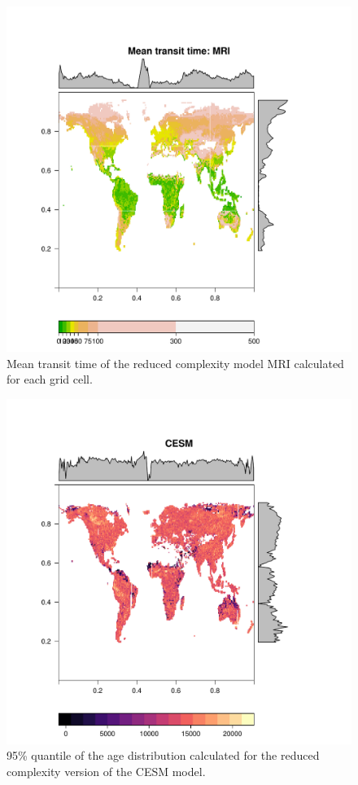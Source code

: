 \documentclass{agujournal}
\begin{document}
\begin{figure}[t]
   \centering
   \includegraphics{Figures/mapTTcolors_MRI} %
   \caption{Mean transit time of the reduced complexity model MRI calculated for each grid cell. }
\end{figure}

\begin{figure}[t]
   \centering
   \includegraphics{Figures/corrP95CESM} %
   \caption{95\% quantile of the age distribution calculated for the reduced complexity version of the CESM model.}
\end{figure}
\end{document}
